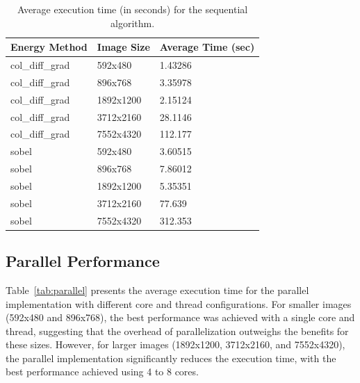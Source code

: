\documentclass[9pt]{IEEEtran}
\begin{document}
\begin{table}[h]
    \centering
    \caption{Average execution time (in seconds) for the sequential algorithm.}
    \label{tab:sequential}
    \begin{tabular}{|l|l|l|}
        \hline
        Energy Method & Image Size & Average Time (sec) \\ \hline
        col\_diff\_grad & 592x480 & 1.43286 \\ \hline
        col\_diff\_grad & 896x768 & 3.35978 \\ \hline
        col\_diff\_grad & 1892x1200 & 2.15124 \\ \hline
        col\_diff\_grad & 3712x2160 & 28.1146 \\ \hline
        col\_diff\_grad & 7552x4320 & 112.177 \\ \hline
        sobel & 592x480 & 3.60515 \\ \hline
        sobel & 896x768 & 7.86012 \\ \hline
        sobel & 1892x1200 & 5.35351 \\ \hline
        sobel & 3712x2160 & 77.639 \\ \hline
        sobel & 7552x4320 & 312.353 \\ \hline
    \end{tabular}
\end{table}

\subsection{Parallel Performance}
Table~\ref{tab:parallel} presents the average execution time for the parallel implementation with different core and thread configurations. For smaller images (592x480 and 896x768), the best performance was achieved with a single core and thread, suggesting that the overhead of parallelization outweighs the benefits for these sizes. However, for larger images (1892x1200, 3712x2160, and 7552x4320), the parallel implementation significantly reduces the execution time, with the best performance achieved using 4 to 8 cores.
\end{document}
